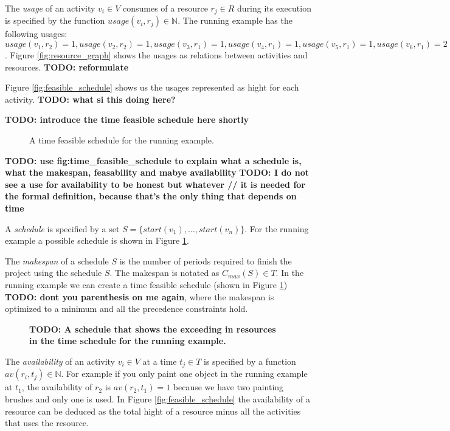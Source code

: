 \documentclass{article}
\theoremstyle{definition}
\newcommand{\TODO}[1]{{\color{red}\textbf{TODO: #1}}}
\newcommand{\res}[0]{\ensuremath{R}} %
\newcommand{\av}[2]{\ensuremath{av(r_{#1}, t_{#2})}} %
\newcommand{\usage}[2]{\ensuremath{usage(v_{#1}, r_{#2})}} %
\newcommand{\start}[1]{\ensuremath{start(v_{#1})}} %
\newcommand{\makespan}[1]{\ensuremath{C_{max}(#1)}} %
\begin{document}
The \emph{usage} of an activity $v_i \in V$ consumes of a resource $r_j \in \res$ during its execution is specified by the function $\usage{i}{j} \in \mathbb{N}$.
The running example has the following usages: $\usage{1}{2} = 1, \usage{2}{2} = 1, \usage{3}{1} = 1, \usage{4}{1} = 1, \usage{5}{1} = 1, \usage{6}{1} = 2$.
Figure \ref{fig:resource_graph} shows the usages as relations between activities and resources. \TODO{reformulate}

Figure \ref{fig:feasible_schedule} shows us the usages represented as hight for each activity. \TODO{what si this doing here?}

\TODO{introduce the time feasible schedule here shortly}
\begin{figure}[h]
	\centering
	
	\caption{A time feasible schedule for the running example. }
	\label{fig:time_feasible_schedule}
\end{figure}

\TODO{use fig:time\_feasible\_schedule to explain what a schedule is, what the makespan, feasability and mabye availability}
\TODO{I do not see a use for availability to be honest but whatever // it is needed for the formal definition, because that's the only thing that depends on time}

A \emph{schedule} is specified by a set $S = \{\start{1}, \ldots, \start{n}\}$.
For the running example a possible schedule is shown in Figure \ref{fig:time_feasible_schedule}.

The \emph{makespan} of a schedule $S$ is the number of periods required to finish the project using the schedule $S$. The makespan is notated as $\makespan{S} \in T$.
In the running example we can create a time feasible schedule (shown in Figure \ref{fig:time_feasible_schedule}) \TODO{dont you parenthesis on me again}, where the makespan is optimized to a minimum and all the precedence constraints hold. 

\begin{figure}[h]
	\centering
	
	\caption{\TODO{A schedule that shows the exceeding in resources in the time schedule for the running example.} }
	\label{fig:fail_schedule}
\end{figure}

The \emph{availability} of an activity $v_i \in V$ at a time $t_j \in T$ is specified by a function $\av{i}{j} \in \mathbb{N}$.
For example if you only paint one object in the running example at $t_1$, the availability of $r_2$ is $\av{2}{1} = 1$ because we have two painting brushes and only one is used.
In Figure \ref{fig:feasible_schedule} the availability of a resource can be deduced as the total hight of a resource minus all the activities that uses the resource. 
\end{document}
